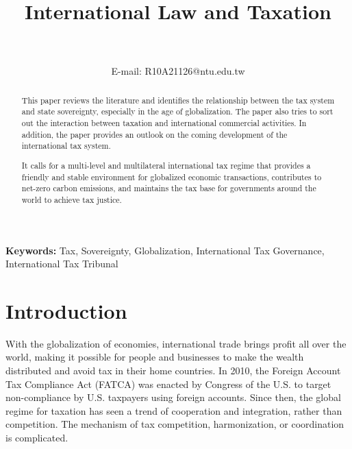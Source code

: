 






\title{International Law and Taxation}
\author{\textbf{\fontsize{14pt}{16.4pt}\selectfont{YIFAN WANG}}~\\\normalsize{}~\\{\normalsize\normalfont  E-mail: R10A21126@ntu.edu.tw}}
\def\RunningHead{{International Law and Taxation}}

\maketitle 


\begin{abstract}
This paper reviews the literature and identifies the relationship between the tax system and state sovereignty, especially in the age of globalization.
The paper also tries to sort out the interaction between taxation and international commercial activities.
In addition, the paper provides an outlook on the coming development of the international tax system.
  
It calls for a multi-level and multilateral international tax regime that provides a friendly and stable environment for globalized economic transactions, contributes to net-zero carbon emissions, and maintains the tax base for governments around the world to achieve tax justice.

\end{abstract}

\def\keywordstitle{Keywords}

\smallskip\noindent\textbf{Keywords: }{Tax, Sovereignty, Globalization, International Tax Governance, International Tax Tribunal} 


\clearpage

\tableofcontents


\pagebreak
\section{Introduction}

With the globalization of economies, international trade brings profit all over the world, making it possible for people and businesses to make the wealth distributed and avoid tax in their home countries. In 2010, the Foreign Account Tax Compliance Act (FATCA) was enacted by Congress of the U.S. to target non-compliance by U.S. taxpayers using foreign accounts. Since then, the global regime for taxation has seen a trend of cooperation and integration, rather than competition. The mechanism of tax competition, harmonization, or coordination is complicated. 

